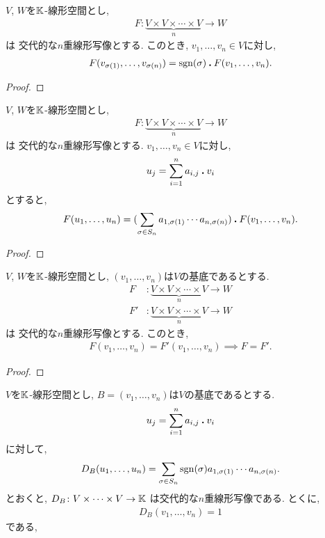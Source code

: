 \begin{prop}
  $V$, $W$を$\mathbb{K}$-線形空間とし,
  \begin{align*}
    F\colon \underbrace{V\times V\times \cdots \times V}_n\to W
  \end{align*}
  は
  交代的な$n$重線形写像とする.
  このとき, $v_1,\ldots,v_n\in V$に対し,
  \begin{align*}
    F(v_{\sigma(1)},\ldots,v_{\sigma(n)})
    =
    \operatorname{sgn}(\sigma)\mathbin{\boldsymbol{.}} F(v_1,\ldots,v_n).
  \end{align*}
\end{prop}
\begin{proof}\end{proof}

\begin{prop}
  $V$, $W$を$\mathbb{K}$-線形空間とし,
  \begin{align*}
    F\colon \underbrace{V\times V\times \cdots \times V}_n\to W
  \end{align*}
  は
  交代的な$n$重線形写像とする.
  $v_1,\ldots,v_n\in V$に対し,
  \begin{align*}
    u_j=\sum_{i=1}^n a_{i,j}\mathbin{\boldsymbol{.}} v_i
  \end{align*}
  とすると,
  \begin{align*}
    F(u_{1},\ldots,u_{n})
    =
    (\sum_{\sigma\in S_n} a_{1,\sigma(1)}\cdots a_{n,\sigma(n)})
    \mathbin{\boldsymbol{.}} F(v_1,\ldots,v_n).
  \end{align*}
\end{prop}
\begin{proof}\end{proof}

\begin{prop}
  $V$, $W$を$\mathbb{K}$-線形空間とし,
  $(v_1,\ldots,v_n)$は$V$の基底であるとする.
  \begin{align*}
    F&\colon \underbrace{V\times V\times \cdots \times V}_n\to W\\
    F'&\colon \underbrace{V\times V\times \cdots \times V}_n\to W
  \end{align*}
  は
  交代的な$n$重線形写像とする.
  このとき,
  \begin{align*}
    F(v_1,\ldots,v_n)=F'(v_1,\ldots,v_n)
    \implies
    F=F'.
  \end{align*}
\end{prop}
\begin{proof}\end{proof}

\begin{example}
  $V$を$\mathbb{K}$-線形空間とし,
  $B=(v_1,\ldots,v_n)$は$V$の基底であるとする.
  \begin{align*}
    u_j=\sum_{i=1}^n a_{i,j}\mathbin{\boldsymbol{.}} v_i
  \end{align*}
  に対して,
  \begin{align*}
    D_B(u_{1},\ldots,u_{n})
    =
    \sum_{\sigma\in S_n} \operatorname{sgn}(\sigma)a_{1,\sigma(1)}\cdots a_{n,\sigma(n)}.
  \end{align*}
  とおくと, $D_B\colon V\times \cdots \times V \to \mathbb{K}$
  は交代的な$n$重線形写像である.
  とくに,
  \begin{align*}
    D_B(v_{1},\ldots,v_{n})=1
  \end{align*}
  である,
\end{example}

